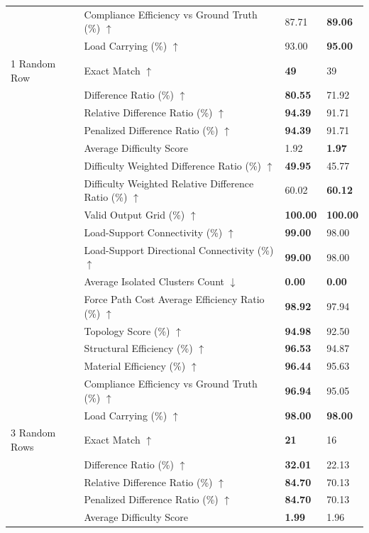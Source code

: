 \begin{table}[!h]
{\begin{tabular}{llll}
 & Compliance Efficiency vs Ground Truth (\%) $\uparrow$ & 87.71 & \textbf{89.06} \\
 & Load Carrying (\%) $\uparrow$ & 93.00 & \textbf{95.00} \\
1 Random Row & Exact Match $\uparrow$ & \textbf{49} & 39 \\
 & Difference Ratio (\%) $\uparrow$ & \textbf{80.55} & 71.92 \\
 & Relative Difference Ratio (\%) $\uparrow$ & \textbf{94.39} & 91.71 \\
 & Penalized Difference Ratio (\%) $\uparrow$ & \textbf{94.39} & 91.71 \\
 & Average Difficulty Score & 1.92 & \textbf{1.97} \\
 & Difficulty Weighted Difference Ratio (\%) $\uparrow$ & \textbf{49.95} & 45.77 \\
 & Difficulty Weighted Relative Difference Ratio (\%) $\uparrow$ & 60.02 & \textbf{60.12} \\
 & Valid Output Grid (\%) $\uparrow$ & \textbf{100.00} & \textbf{100.00} \\
 & Load-Support Connectivity (\%) $\uparrow$ & \textbf{99.00} & 98.00 \\
 & Load-Support Directional Connectivity (\%) $\uparrow$ & \textbf{99.00} & 98.00 \\
 & Average Isolated Clusters Count $\downarrow$ & \textbf{0.00} & \textbf{0.00} \\
 & Force Path Cost Average Efficiency Ratio (\%) $\uparrow$ & \textbf{98.92} & 97.94 \\
 & Topology Score (\%) $\uparrow$ & \textbf{94.98} & 92.50 \\
 & Structural Efficiency (\%) $\uparrow$ & \textbf{96.53} & 94.87 \\
 & Material Efficiency (\%) $\uparrow$ & \textbf{96.44} & 95.63 \\
 & Compliance Efficiency vs Ground Truth (\%) $\uparrow$ & \textbf{96.94} & 95.05 \\
 & Load Carrying (\%) $\uparrow$ & \textbf{98.00} & \textbf{98.00} \\
3 Random Rows & Exact Match $\uparrow$ & \textbf{21} & 16 \\
 & Difference Ratio (\%) $\uparrow$ & \textbf{32.01} & 22.13 \\
 & Relative Difference Ratio (\%) $\uparrow$ & \textbf{84.70} & 70.13 \\
 & Penalized Difference Ratio (\%) $\uparrow$ & \textbf{84.70} & 70.13 \\
 & Average Difficulty Score & \textbf{1.99} & 1.96 \\

\end{tabular}}
\end{table}
